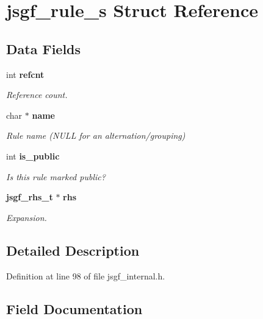 \section{jsgf\+\_\+rule\+\_\+s Struct Reference}
\label{structjsgf__rule__s}
\subsection*{Data Fields}
\begin{DoxyCompactItemize}
\item 
int \textbf{ refcnt}
\begin{DoxyCompactList}\small\item\em Reference count. \end{DoxyCompactList}\item 
\mbox{\label{structjsgf__rule__s_a1b1de5afa4c0f27df4e8d51ebc47ca92}} 
char $\ast$ \textbf{ name}
\begin{DoxyCompactList}\small\item\em Rule name (N\+U\+LL for an alternation/grouping) \end{DoxyCompactList}\item 
\mbox{\label{structjsgf__rule__s_a36478d9850594d6a201c6724ec1f1fa4}} 
int \textbf{ is\+\_\+public}
\begin{DoxyCompactList}\small\item\em Is this rule marked \textquotesingle{}public\textquotesingle{}? \end{DoxyCompactList}\item 
\mbox{\label{structjsgf__rule__s_a6923b74ad72f8b663cc00dfa99490981}} 
\textbf{ jsgf\+\_\+rhs\+\_\+t} $\ast$ \textbf{ rhs}
\begin{DoxyCompactList}\small\item\em Expansion. \end{DoxyCompactList}\end{DoxyCompactItemize}


\subsection{Detailed Description}


Definition at line 98 of file jsgf\+\_\+internal.\+h.



\subsection{Field Documentation}
\mbox{\label{structjsgf__rule__s_aeb4c05f6daa425a37d362e2c6de1228e}} 

